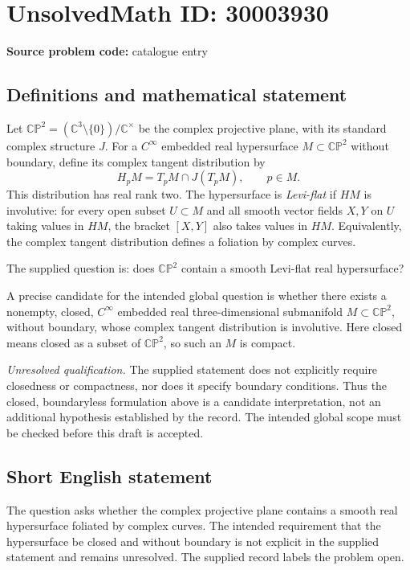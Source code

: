 \documentclass[11pt]{article}
\newcommand{\C}{\mathbb{C}}
\begin{document}
\section*{UnsolvedMath ID: 30003930}
\textbf{Source problem code:} catalogue entry
\subsection{Definitions and mathematical statement}
Let \(\mathbb{CP}^{2}=(\C^{3}\setminus\{0\})/\C^{\times}\) be the complex projective plane, with its standard complex structure \(J\). For a \(C^{\infty}\) embedded real hypersurface \(M\subset\mathbb{CP}^{2}\) without boundary, define its complex tangent distribution by
\[
H_pM=T_pM\cap J(T_pM),\qquad p\in M.
\]
This distribution has real rank two. The hypersurface is \emph{Levi-flat} if \(HM\) is involutive: for every open subset \(U\subset M\) and all smooth vector fields \(X,Y\) on \(U\) taking values in \(HM\), the bracket \([X,Y]\) also takes values in \(HM\). Equivalently, the complex tangent distribution defines a foliation by complex curves.

The supplied question is: does \(\mathbb{CP}^{2}\) contain a smooth Levi-flat real hypersurface?

A precise candidate for the intended global question is whether there exists a nonempty, closed, \(C^{\infty}\) embedded real three-dimensional submanifold \(M\subset\mathbb{CP}^{2}\), without boundary, whose complex tangent distribution is involutive. Here closed means closed as a subset of \(\mathbb{CP}^{2}\), so such an \(M\) is compact.

\emph{Unresolved qualification.} The supplied statement does not explicitly require closedness or compactness, nor does it specify boundary conditions. Thus the closed, boundaryless formulation above is a candidate interpretation, not an additional hypothesis established by the record. The intended global scope must be checked before this draft is accepted.
\subsection{Short English statement}
The question asks whether the complex projective plane contains a smooth real hypersurface foliated by complex curves. The intended requirement that the hypersurface be closed and without boundary is not explicit in the supplied statement and remains unresolved. The supplied record labels the problem open.
\end{document}
